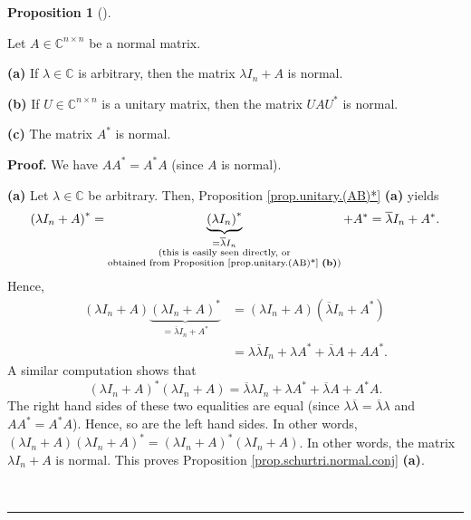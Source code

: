 \documentclass[numbers=enddot,12pt,final,onecolumn,notitlepage]{scrartcl}%
\numberwithin{exer}{subsection}
\theoremstyle{definition}
\newtheorem{prop}[theo]{Proposition}
\newenvironment{proposition}[1][]
{\begin{prop}[#1]\begin{leftbar}}
{\end{leftbar}\end{prop}}
\newenvironment{proof}[1][Proof]{\noindent\textbf{#1.} }{\ \rule{0.5em}{0.5em}}
\begin{document}
\begin{proposition}
\label{prop.schurtri.normal.conj}Let $A\in\mathbb{C}^{n\times n}$ be a normal
matrix. \medskip

\textbf{(a)} If $\lambda\in\mathbb{C}$ is arbitrary, then the matrix $\lambda
I_{n}+A$ is normal. \medskip

\textbf{(b)} If $U\in\mathbb{C}^{n\times n}$ is a unitary matrix, then the
matrix $UAU^{\ast}$ is normal. \medskip

\textbf{(c)} The matrix $A^{\ast}$ is normal.
\end{proposition}

\begin{proof}
We have $AA^{\ast}=A^{\ast}A$ (since $A$ is normal). \medskip

\textbf{(a)} Let $\lambda\in\mathbb{C}$ be arbitrary. Then, Proposition
\ref{prop.unitary.(AB)*} \textbf{(a)} yields%
\[
\left(  \lambda I_{n}+A\right)  ^{\ast}=\underbrace{\left(  \lambda
I_{n}\right)  ^{\ast}}_{\substack{=\overline{\lambda}I_{n}\\\text{(this is
easily seen directly, or}\\\text{obtained from Proposition
\ref{prop.unitary.(AB)*} \textbf{(b)})}}}+A^{\ast}=\overline{\lambda}%
I_{n}+A^{\ast}.
\]
Hence,
\begin{align*}
\left(  \lambda I_{n}+A\right)  \underbrace{\left(  \lambda I_{n}+A\right)
^{\ast}}_{=\overline{\lambda}I_{n}+A^{\ast}}  &  =\left(  \lambda
I_{n}+A\right)  \left(  \overline{\lambda}I_{n}+A^{\ast}\right) \\
&  =\lambda\overline{\lambda}I_{n}+\lambda A^{\ast}+\overline{\lambda
}A+AA^{\ast}.
\end{align*}
A similar computation shows that%
\[
\left(  \lambda I_{n}+A\right)  ^{\ast}\left(  \lambda I_{n}+A\right)
=\overline{\lambda}\lambda I_{n}+\lambda A^{\ast}+\overline{\lambda}A+A^{\ast
}A.
\]
The right hand sides of these two equalities are equal (since $\lambda
\overline{\lambda}=\overline{\lambda}\lambda$ and $AA^{\ast}=A^{\ast}A$).
Hence, so are the left hand sides. In other words, $\left(  \lambda
I_{n}+A\right)  \left(  \lambda I_{n}+A\right)  ^{\ast}=\left(  \lambda
I_{n}+A\right)  ^{\ast}\left(  \lambda I_{n}+A\right)  $. In other words, the
matrix $\lambda I_{n}+A$ is normal. This proves Proposition
\ref{prop.schurtri.normal.conj} \textbf{(a)}. \medskip


\end{proof}
\end{document}

